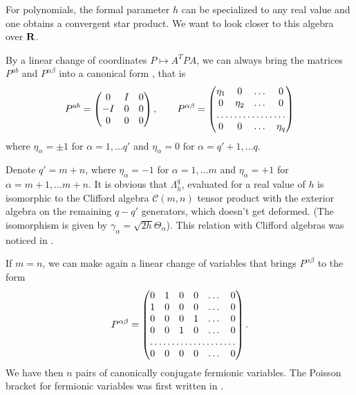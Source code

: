 \documentclass[a4paper,12pt]{article}
\begin{document}
For polynomials, the formal parameter $h$ can be specialized to any real
value and one obtains a convergent star product. We want to look closer
to this algebra over ${\bf R}$.



By a linear change of
coordinates $P\mapsto A^TPA$, we can always bring the matrices $P^{ab}$
and
$P^{\alpha\beta}$ into a canonical form  \cite{am}, that is
\begin{equation}
P^{ab}=\begin{pmatrix} 0 & I & 0 \\
-I & 0 & 0\\
0 & 0 & 0\end{pmatrix},\qquad
P^{\alpha\beta}=\begin{pmatrix}\eta_1 & 0 & \dots & 0\\
0 &\eta_2 & \dots & 0\\
\hdotsfor{4}\\
0 & 0 &\dots & \eta_q \end{pmatrix}
\end{equation}
where $\eta_\alpha=\pm 1$ for $\alpha=1,\dots q'$ and $\eta_\alpha=0$ for
$\alpha=q'+1,\dots q$.

Denote  $q'=m+n$, where $\eta_\alpha=-1$ for $\alpha=1,\dots m$ and
$\eta_\alpha=+1$ for $\alpha=m+1,\dots m+n$. It is obvious that
$\Lambda^q_h$, evaluated for a real value of $h$ is isomorphic to the
Clifford algebra $\mathcal{C}(m,n)$ tensor product with the exterior
algebra on the remaining $q-q'$ generators, which doesn't get deformed.
(The isomorphism is given by $\gamma_\alpha=\sqrt{2h}\Theta_\alpha$).
This relation with Clifford algebras was  noticed in \cite{be}.

If $m=n$, we can make again a linear change of variables that brings
$P^{\alpha\beta}$ to the form
$$
P^{\alpha\beta}=\begin{pmatrix}0 & 1 & 0 & 0 & \dots & 0\\
                               1 & 0 & 0 & 0 & \dots & 0\\
                               0 & 0 & 0 & 1 & \dots & 0\\
                               0 & 0 & 1 & 0 & \dots & 0\\
                               \hdotsfor{6}\\
                               0 & 0 & 0 & 0 & \dots & 0 \end{pmatrix}.
$$
We have then $n$ pairs of canonically conjugate fermionic variables.
 The Poisson bracket for 
fermionic variables was first written in \cite{mi}.
\end{document}

